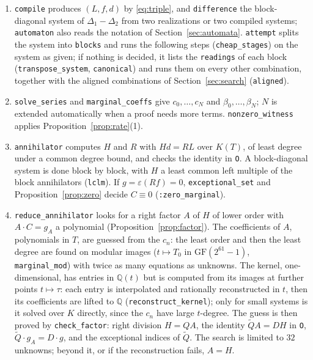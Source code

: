 \documentclass[11pt,a4paper]{article}
\newcommand{\Q}{\mathbb Q}
\newcommand{\eps}{\varepsilon}
\theoremstyle{plain}
\theoremstyle{definition}
\theoremstyle{remark}
\begin{document}
\begin{enumerate}
\item \texttt{compile} produces $(L,f,d)$ by \eqref{eq:triple}, and
  \texttt{difference} the block-diagonal system of $\Delta_1-\Delta_2$ from two
  realizations or two compiled systems; \texttt{automaton} also reads the
  notation of Section~\ref{sec:automata}. \texttt{attempt} splits the system
  into \texttt{blocks} and runs the following steps (\texttt{cheap\_stages}) on
  the system as given; if nothing is decided, it lists the \texttt{readings} of
  each block (\texttt{transpose\_system}, \texttt{canonical}) and runs them on
  every other combination, together with the aligned combinations of
  Section~\ref{sec:search} (\texttt{aligned}).
\item \texttt{solve\_series} and \texttt{marginal\_coeffs} give $c_0,\dots,c_N$
  and $\beta_0,\dots,\beta_N$; $N$ is extended automatically when a proof needs
  more terms. \texttt{nonzero\_witness} applies Proposition~\ref{prop:rate}(1).
\item \texttt{annihilator} computes $H$ and $R$ with $Hd=RL$ over $K(T)$, of
  least degree under a common degree bound, and checks the identity in
  \texttt{O}. A block-diagonal system is done block by block, with $H$ a least
  common left multiple of the block annihilators (\texttt{lclm}). If
  $g=\eps(Rf)=0$, \texttt{exceptional\_set} and Proposition~\ref{prop:zero}
  decide $C\equiv0$ (\texttt{:zero\_marginal}).
\item \texttt{reduce\_annihilator} looks for a right factor $A$ of $H$ of lower
  order with $A\cdot C=g_A$ a polynomial (Proposition~\ref{prop:factor}). The
  coefficients of $A$, polynomials in $T$, are guessed from the $c_n$: the least
  order and then the least degree are found on modular images ($t\mapsto T_0$ in
  $\mathrm{GF}(2^{61}-1)$, \texttt{marginal\_mod}) with twice as many equations
  as unknowns. The kernel, one-dimensional, has entries in $\Q(t)$ but is
  computed from its images at further points $t\mapsto\tau$: each entry is
  interpolated and rationally reconstructed in $t$, then its coefficients are
  lifted to $\Q$ (\texttt{reconstruct\_kernel}); only for small systems is it
  solved over $K$ directly, since the $c_n$ have large $t$-degree. The guess
  is then proved by \texttt{check\_factor}: right division $H=QA$, the
  identity $\widetilde QA=DH$ in \texttt{O}, $\widetilde Q\cdot g_A=D\cdot g$,
  and the exceptional indices of $\widetilde Q$. The search is limited to $32$
  unknowns; beyond it, or if the reconstruction fails, $A=H$.

\end{enumerate}
\end{document}
